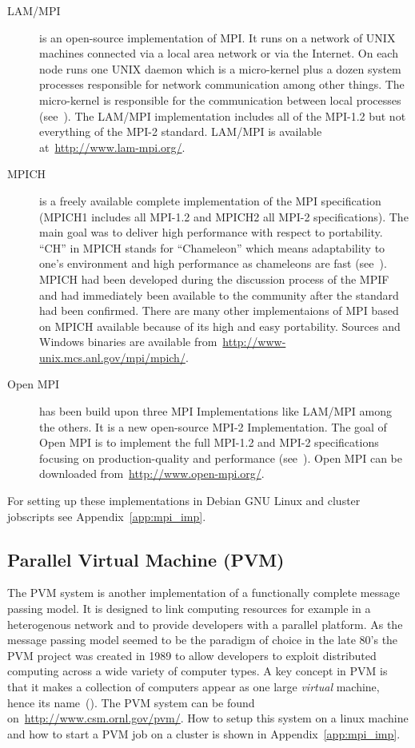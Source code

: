 \begin{description}
\item[LAM/MPI] is an open-source implementation of MPI. It runs on a
  network of UNIX machines connected via a local area network or via
  the Internet. On each node runs one UNIX daemon which is a
  micro-kernel plus a dozen system processes responsible for network
  communication among other things. The micro-kernel is
  responsible for the communication between local processes
  (see~\cite{burns94lam}). The LAM/MPI implementation includes all of
  the MPI-1.2 but not everything of the MPI-2 standard. LAM/MPI is
  available at~\url{http://www.lam-mpi.org/}.
\item[MPICH] is a freely available complete implementation of the MPI
  specification (MPICH1 includes all MPI-1.2 and MPICH2 all MPI-2
  specifications). The main goal was to deliver high performance with
  respect to portability. ``CH'' in MPICH stands for ``Chameleon''
  which means adaptability to one's environment and high performance
  as chameleons are fast (see~\cite{gropp96mpich}). MPICH had been
  developed during the discussion process of the MPIF and had immediately been
  available to the community after the standard had been
  confirmed. There are many other implementaions of MPI based on MPICH
  available because of its high and easy portability. Sources and
  Windows binaries are available
  from~\url{http://www-unix.mcs.anl.gov/mpi/mpich/}.
\item[Open MPI] has been build upon three MPI Implementations like
  LAM/MPI among the others. It is a new open-source MPI-2
  Implementation. The goal of Open MPI is to implement the full
  MPI-1.2 and MPI-2 specifications focusing on production-quality and
  performance (see~\cite{gabriel04:_open_mpi}). Open MPI can be
  downloaded from~\url{http://www.open-mpi.org/}.
\end{description}

For setting up these implementations in Debian GNU Linux and cluster
jobscripts see Appendix~\ref{app:mpi_imp}. 

\subsection{Parallel Virtual Machine (PVM)}
\label{sec:PVM}

The PVM system is another implementation of a functionally
complete message passing model. It is designed to link computing
resources for example in a heterogenous network and to provide
developers with a parallel platform. As the message passing model
seemed to be the paradigm of choice in the late 80's the PVM project
was created in 1989 to allow developers to exploit distributed
computing across a wide variety of computer types. A key concept in
PVM is that it makes a collection of computers appear as one large
\textit{virtual} machine, hence its name~(\cite{geist94pvm}). The PVM
system can be found on~\url{http://www.csm.ornl.gov/pvm/}. How to
setup this system on a linux machine and how to start a PVM job on a
cluster is shown in Appendix~\ref{app:mpi_imp}.

